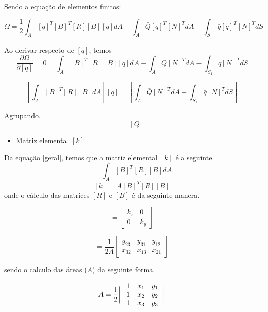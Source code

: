 \documentclass{article} %
\begin{document}
Sendo a equação de elementos finitos:

\begin{equation}
\Omega=\frac{1}{2}\int_{A}[q]^T[B]^T[R][B][q]dA-\int_{A}\bar{Q}[q]^T[N]^TdA-\int_{S_1}\bar{q}[q]^T[N]^TdS
\end{equation}

Ao derivar respecto de \([q]\), temos
\begin{equation}
\frac{\partial\Omega}{\partial [q]}=0=\int_{A}[B]^T[R][B][q]dA-\int_{A}\bar{Q}[N]^TdA-\int_{S_1}\bar{q}[N]^TdS
\end{equation}

\begin{equation}\label{geral}
\left[\int_{A}[B]^T[R][B]dA\right][q]=\left[\int_{A}\bar{Q}[N]^TdA+\int_{S_1}\bar{q}[N]^TdS\right]
\end{equation}

Agrupando.
\begin{equation}
[k][q]=[Q]
\end{equation}


\begin{itemize}
	\item Matriz elemental \([k]\)	
\end{itemize}

Da equação \ref{geral}, temos que a matriz elemental \([k]\) é a seguinte.
\begin{equation}
[k]=\int_{A}[B]^T[R][B]dA
\end{equation}
\begin{equation}\label{kelemento}
[k]=A[B]^T[R][B]
\end{equation}
onde o cálculo das matrices \([R]\)  e \([B]\) é da seguinte manera.



\begin{equation}
[R]=\begin{bmatrix}
k_x&0\\0&k_y
\end{bmatrix}
\end{equation}

\begin{equation}
[B]=\frac{1}{2A}\begin{bmatrix}
y_{23}&y_{31}&y_{12}\\x_{32}&x_{13}&x_{21}
\end{bmatrix}
\end{equation}

sendo o calculo das áreas (\(A\)) da seguinte forma.

\begin{equation}
A=\frac{1}{2}\biggr|\color{white}\begin{bmatrix}\color{black}
1&\color{black}x_1&\color{black}y_1\\\color{black}1&\color{black}x_2&\color{black}y_2\\\color{black}1&\color{black}x_3&\color{black}y_3
\color{white}\end{bmatrix}\color{black}\biggr|
\end{equation}
\end{document}
